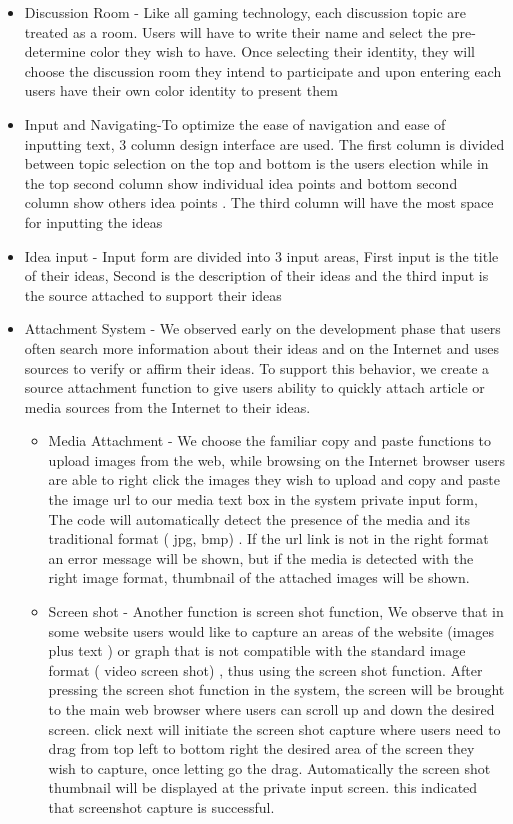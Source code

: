 \documentclass{sigchi}
\begin{document}
\begin{itemize}


\item Discussion Room - Like all gaming technology, each discussion  topic are treated as a room.  Users will have to write their name and select the pre-determine color they wish to have. Once selecting their identity, they will choose the discussion room they intend to participate and upon entering each users have their own color identity to present them 
\item  Input and Navigating-To optimize the ease of navigation and ease of inputting text, 3 column design interface are used. The first column is divided between topic selection on the top and bottom is the users election while in the top second column show individual idea points and bottom second column show others idea points . The third column will have the most space for inputting the ideas
\item Idea input - Input form are divided into 3 input  areas, First input is the title of their ideas, Second is the description of their ideas and  the third input is the source  attached to support their ideas
\item Attachment System - We observed early on the development phase  that users often search more information about their ideas and on the Internet and uses sources to verify or affirm  their ideas. To support this behavior, we create a source attachment function to give users ability to quickly attach article or media sources from the Internet to their ideas. 
\begin{itemize}
  \item  Media Attachment - We choose the familiar copy and paste functions to upload images from the web, while browsing on the Internet browser users are able to right click the images they wish to upload and copy and paste the image url to our media text box in the system private input form, The code will automatically detect the presence of the media and its traditional format ( jpg, bmp) . If the url link is not in the right format an error message will be shown, but if the media is detected with the right image format,  thumbnail of the attached images will be shown.

  \item Screen shot - Another function is screen shot function, We observe that in some website users would like to capture an areas of the website (images plus text ) or graph that is not compatible with the standard image format ( video screen shot) , thus using the screen shot function. After pressing the screen shot function in the system, the screen will be brought to the main web browser where users can scroll up and down the desired screen. click next will initiate the screen shot capture where users need to drag from top left to bottom right the desired area of the screen they wish to capture, once letting go the drag. Automatically the screen shot thumbnail will be displayed at the private input screen. this indicated that screenshot capture is successful. 
\end{itemize}


\end{itemize}
\end{document}
